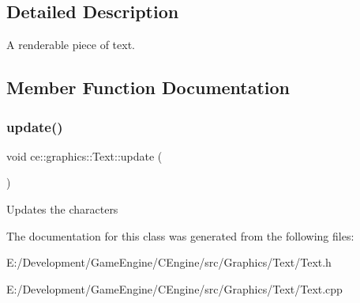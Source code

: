 \subsection{Detailed Description}
A renderable piece of text. 

\subsection{Member Function Documentation}
\mbox{\label{classce_1_1graphics_1_1_text_a666aae08c7a6c6344b0722ffbefd6fb3}} 
\subsubsection{\texorpdfstring{update()}{update()}}
{\footnotesize\ttfamily void ce\+::graphics\+::\+Text\+::update (\begin{DoxyParamCaption}{ }\end{DoxyParamCaption})\hspace{0.3cm}{\ttfamily [protected]}}

Updates the characters 

The documentation for this class was generated from the following files\+:\begin{DoxyCompactItemize}
\item 
E\+:/\+Development/\+Game\+Engine/\+C\+Engine/src/\+Graphics/\+Text/Text.\+h\item 
E\+:/\+Development/\+Game\+Engine/\+C\+Engine/src/\+Graphics/\+Text/Text.\+cpp\end{DoxyCompactItemize}
